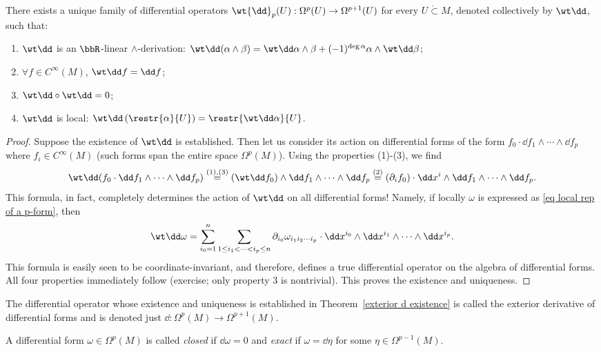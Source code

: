 \begin{thm}\label{exterior d existence}
    There exists a unique family of differential operators $\wt{\dd}_p(U):\Omega^p(U)\to \Omega^{p+1}(U)$ for every $U\mathring\subset M$, denoted collectively by $\wt\dd$, such that:
\begin{enumerate}
    \item $\wt\dd$ is an $\bbR $-linear $\wedge$-derivation: $\wt\dd(\alpha\wedge\beta)=\wt\dd\alpha\wedge\beta+(-1)^{\deg\alpha}\alpha\wedge\wt\dd\beta$;
    \item $\forall f\in C^\infty(M)$, $\wt\dd f=\dd f$;
    \item $\wt\dd\circ\wt\dd=0$;
    \item $\wt\dd$ is local: $\wt\dd\left(\restr{\alpha}{U}\right)=\restr{\wt\dd\alpha}{U}$.
\end{enumerate}
\end{thm}
\begin{proof}
    Suppose the existence of $\wt\dd$ is established. Then let us consider its action on differential forms of the form $f_0\cdot \dd f_1\wedge \cdots \wedge \dd f_p$ where $f_i\in C^\infty(M)$ (such forms span the entire space $\Omega^p(M)$). Using the properties (1)-(3), we find
    \[\wt\dd (f_0\cdot \dd f_1\wedge \cdots \wedge \dd f_p)\overset{(1),(3)}{=}(\wt\dd f_0) \wedge \dd f_1\wedge \cdots \wedge \dd f_p\overset{(2)}{=}(\partial_i f_0)\cdot \dd x^i\wedge \dd f_1\wedge \cdots \wedge \dd f_p.\]
    This formula, in fact, completely determines the action of $\wt\dd$ on all differential forms! Namely, if locally $\omega$ is expressed as \eqref{eq local rep of a p-form}, then
    \[\wt\dd \omega =\sum_{i_0=1}^n\sum_{1\leq i_1<\cdots <i_p\leq n}\partial_{i_0}\omega_{i_1 i_2\cdots i_p}\cdot \dd x^{i_0}\wedge \dd x^{i_1}\wedge\cdots\wedge \dd x^{i_p}.\label{eq local formula for d}\]
    This formula is easily seen to be coordinate-invariant, and therefore, defines a true differential operator on the algebra of differential forms. All four properties immediately follow (exercise; only property 3 is nontrivial). This proves the existence and uniqueness.
\end{proof}

\begin{defn}
    The differential operator whose existence and uniqueness is established in Theorem~\ref{exterior d existence} is called the exterior derivative of differential forms and is denoted just $\dd:\Omega^p(M)\to\Omega^{p+1}(M)$.

    A differential form $\omega\in\Omega^p(M)$ is called \emph{closed} if $\dd\omega=0$ and \emph{exact} if $\omega=\dd\eta$ for some $\eta\in\Omega^{p-1}(M)$. 
\end{defn}

